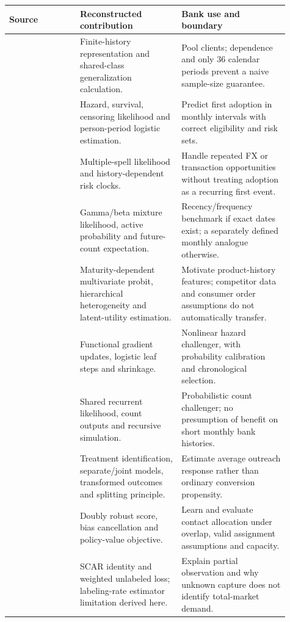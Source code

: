 \begin{longtable}{P{0.23\linewidth}P{0.33\linewidth}P{0.35\linewidth}}
\toprule
Source & Reconstructed contribution & Bank use and boundary\\
\midrule
\endhead
\citet{montero2021global} & Finite-history representation and shared-class generalization calculation. & Pool clients; dependence and only 36 calendar periods prevent a naive sample-size guarantee.\\
\citet{singer1993time} & Hazard, survival, censoring likelihood and person-period logistic estimation. & Predict first adoption in monthly intervals with correct eligibility and risk sets.\\
\citet{willett1995multiple} & Multiple-spell likelihood and history-dependent risk clocks. & Handle repeated FX or transaction opportunities without treating adoption as a recurring first event.\\
\citet{fader2005counting} & Gamma/beta mixture likelihood, active probability and future-count expectation. & Recency/frequency benchmark if exact dates exist; a separately defined monthly analogue otherwise.\\
\citet{li2005cross} & Maturity-dependent multivariate probit, hierarchical heterogeneity and latent-utility estimation. & Motivate product-history features; competitor data and consumer order assumptions do not automatically transfer.\\
\citet{friedman2001greedy} & Functional gradient updates, logistic leaf steps and shrinkage. & Nonlinear hazard challenger, with probability calibration and chronological selection.\\
\citet{salinas2020deepar} & Shared recurrent likelihood, count outputs and recursive simulation. & Probabilistic count challenger; no presumption of benefit on short monthly bank histories.\\
\citet{gutierrez2017causal} & Treatment identification, separate/joint models, transformed outcomes and splitting principle. & Estimate average outreach response rather than ordinary conversion propensity.\\
\citet{wager2021policy} & Doubly robust score, bias cancellation and policy-value objective. & Learn and evaluate contact allocation under overlap, valid assignment assumptions and capacity.\\
\citet{elkan2008pu} & SCAR identity and weighted unlabeled loss; labeling-rate estimator limitation derived here. & Explain partial observation and why unknown capture does not identify total-market demand.\\
\bottomrule
\end{longtable}

